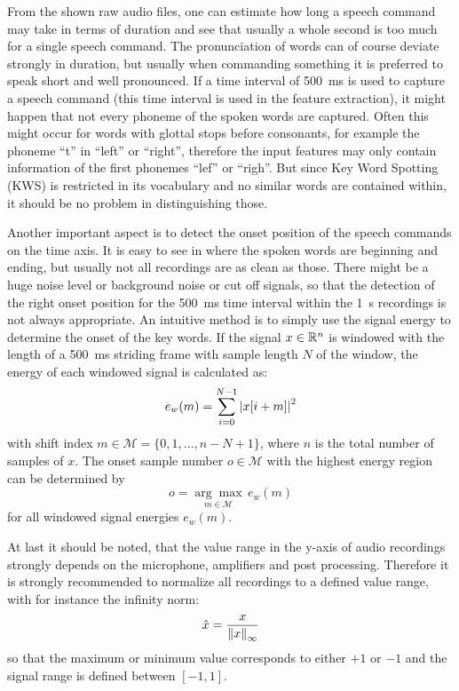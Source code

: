 From the shown raw audio files, one can estimate how long a speech command may take in terms of duration and see that usually a whole second is too much for a single speech command.
The pronunciation of words can of course deviate strongly in duration, but usually when commanding something it is preferred to speak short and well pronounced.
If a time interval of \SI{500}{\milli\second} is used to capture a speech command (this time interval is used in the feature extraction), it might happen that not every phoneme of the spoken words are captured. 
Often this might occur for words with glottal stops before consonants, for example the phoneme \enquote{t} in \enquote{left} or \enquote{right}, therefore the input features may only contain information of the first phonemes \enquote{lef} or \enquote{righ}.
But since Key Word Spotting (KWS) is restricted in its vocabulary and no similar words are contained within, it should be no problem in distinguishing those.

Another important aspect is to detect the onset position of the speech commands on the time axis. 
It is easy to see in  where the spoken words are beginning and ending, but usually not all recordings are as clean as those.
There might be a huge noise level or background noise or cut off signals, so that the detection of the right onset position for the \SI{500}{\milli\second} time interval within the \SI{1}{\second} recordings is not always appropriate.
An intuitive method is to simply use the signal energy to determine the onset of the key words.
If the signal $x \in \mathbb{R}^n$ is windowed with the length of a \SI{500}{\milli\second} striding frame with sample length $N$ of the window, the energy of each windowed signal is calculated as:
\begin{equation}
  e_{w}(m) = \sum_{i=0}^{N-1} \abs{x[i + m]}^2
\end{equation}
with shift index $m \in \mathcal{M} = \{0, 1, \dots, n - N + 1\}$, where $n$ is the total number of samples of $x$.
The onset sample number $o \in \mathcal{M}$ with the highest energy region can be determined by
\begin{equation}
  o = \underset{m \in \mathcal{M}}{\arg \max} \, e_{w}(m)
\end{equation}
for all windowed signal energies $e_{w}(m)$.

At last it should be noted, that the value range in the y-axis of audio recordings strongly depends on the microphone, amplifiers and post processing.
Therefore it is strongly recommended to normalize all recordings to a defined value range, with for instance the infinity norm:
\begin{equation}
  \hat{x} = \frac{x}{\norm{x}_\infty}
\end{equation}
so that the maximum or minimum value corresponds to either $+1$ or $-1$ and the signal range is defined between $[-1, 1]$.